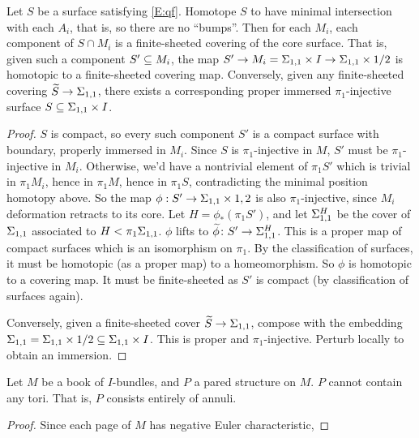 \begin{lemma}\label{L:sc}

Let $S$ be a surface satisfying \eqref{E:qf}. Homotope $S$ to have minimal
intersection with each $A_i$, that is, so there are no ``bumps''.  Then for
each $M_i$, each component of $S \cap M_i$ is a finite-sheeted covering of the
core surface.  That is, given such a component $S' \subseteq M_i$, the map $S' \to
M_i = \Sigma_{1,1}\times I \to \Sigma_{1,1}\times{1/2}$ is homotopic to a finite-sheeted
covering map. Conversely, given any finite-sheeted covering $\widetilde{S} \to
\Sigma_{1,1}$, there exists a corresponding proper immersed $\pi_1$-injective
surface $S \subseteq \Sigma_{1,1}\times I$.

\end{lemma}
\begin{proof}

$S$ is compact, so every such component $S'$ is a compact surface with
boundary, properly immersed in $M_i$. Since $S$ is $\pi_1$-injective in $M$,
$S'$ must be $\pi_1$-injective in $M_i$. Otherwise, we'd have a nontrivial
element of $\pi_1S'$ which is trivial in $\pi_1M_i$, hence in $\pi_1M$, hence
in $\pi_1S$, contradicting the minimal position homotopy above. So the map
$\phi : S'\to\Sigma_{1,1}\times{1,2}$ is also $\pi_1$-injective, since $M_i$
deformation retracts to its core. Let $H = \phi_*(\pi_1S')$, and let
$\Sigma_{1,1}^H$ be the cover of $\Sigma_{1,1}$ associated to $H<\pi_1\Sigma_{1,1}$.
$\phi$ lifts to $\widetilde{\phi}\colon S'\to \Sigma_{1,1}^H$. This is a proper
map of compact surfaces which is an isomorphism on $\pi_1$.  By the
classification of surfaces, it must be homotopic (as a proper map) to
a homeomorphism. So $\phi$ is homotopic to a covering map. It must be
finite-sheeted as $S'$ is compact (by classification of surfaces again).

Conversely, given a finite-sheeted cover $\widetilde{S}\to \Sigma_{1,1}$, compose
with the embedding $\Sigma_{1,1} = \Sigma_{1,1}\times{1/2} \subseteq \Sigma_{1,1}\times I$. This is
proper and $\pi_1$-injective.  Perturb locally to obtain an immersion.

\end{proof}

\begin{lemma}

Let $M$ be a book of $I$-bundles, and $P$ a pared structure on $M$. $P$ cannot
contain any tori.  That is, $P$ consists entirely of annuli.

\end{lemma}
\begin{proof}

Since each page of $M$ has negative Euler characteristic, 

\end{proof}


